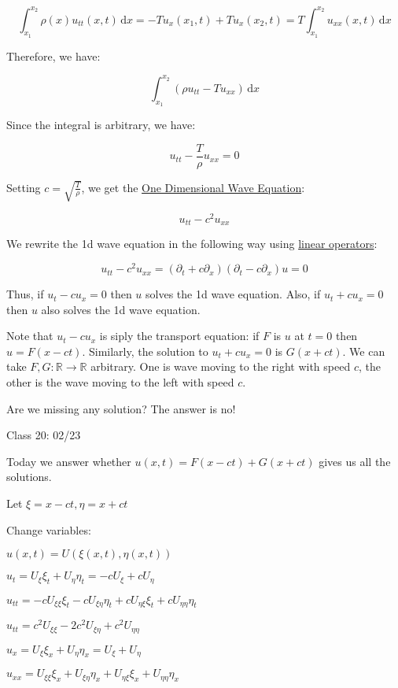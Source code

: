 \documentclass{article}
\theoremstyle{definition}
\begin{document}
\[
    \int_{x_1}^{x_2} \rho(x)u_{tt}(x,t) \,\mathrm{d}x = - T u_x(x_1,t) + Tu_x(x_2,t) = T \int_{x_1}^{x_2} u_{xx}(x,t) \,\mathrm{d}x 
\]

Therefore, we have:

\[
    \int_{x_1}^{x_2} (\rho u_{t t} - T u_{x x}) \,\mathrm{d}x 
\]

Since the integral is arbitrary, we have:

\[
    u_{tt} - \frac{T}{\rho}u_{x x} = 0
\]

Setting \(c = \sqrt{\frac{T}{\rho}}\), we get the \underline{One Dimensional Wave Equation}:

\[
    \boxed{ u_{t t} - c^2 u_{x x} }
\]

We rewrite the 1d wave equation in the following way using \underline{linear operators}:

\[
    u_{t t} - c^2 u_{x x} = (\partial_t + c \partial_x)(\partial_t - c \partial _{x}) u = 0
\]

Thus, if \(u_t - cu_x = 0\) then \(u\) solves the 1d wave equation. Also, if \(u_t + cu_x = 0\) then \(u\) also solves the 1d wave equation.

Note that \(u_t - cu_x\) is siply the transport equation: if \(F\) is \(u\) at \(t=0\) then \(u = F(x-ct)\). Similarly, the solution to \(u_t + cu_x = 0\) is \(G(x+ct)\). We can take \(F,G:\mathbb{R} \to \mathbb{R}\) arbitrary. One is wave moving to the right with speed \(c\), the other is the wave moving to the left with speed \(c\).

Are we missing any solution? The answer is no!

\hrulefill

Class 20: 02/23

Today we answer whether \(u(x,t)=F(x-ct)+G(x+ct)\) gives us all the solutions.

Let \(\xi = x- ct, \eta = x + ct\) 

Change variables:

\(u(x,t) = U(\xi(x,t),\eta(x,t))\) 

\(u_t = U_\xi \xi_t + U_\eta \eta_t = -cU_\xi + cU_\eta\)

\(u_{tt} = - c U_{\xi\xi}\xi_t - cU_{\xi\eta}\eta_t + c U_{\eta\xi}\xi_t + c U_{\eta\eta}\eta_t\)

\(u_{tt} = c^2 U_{\xi\xi}-2c^2 U_{\xi\eta}+c^2 U_{\eta\eta}\) 

\(u_x = U_\xi\xi_x + U_\eta\eta_x = U_\xi+U_\eta\)

\(u_{x x} = U_{\xi\xi}\xi_x + U_{\xi\eta}\eta_x + U_{\eta\xi}\xi_x + U_{\eta\eta}\eta_x\)
\end{document}
